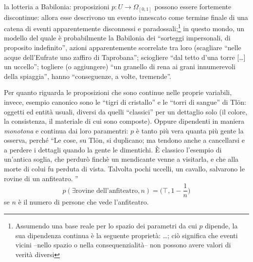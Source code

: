 \documentclass{amsart}
\begin{document}
\begin{example}
  la lotteria a Babilonia: proposizioni $p : U \to \Omega_{[0,1]}$ possono essere fortemente discontinue: allora esse descrivono un evento innescato come termine finale di una catena di eventi apparentemente disconnessi e paradossali;\footnote{Assumendo una base reale per lo spazio dei parametri da cui $p$ dipende, la sua dipendenza continua è la seguente proprietà: \dots; ciò significa che eventi vicini --nello spazio o nella consequenzialità-- non possono avere valori di verità diversi} in questo mondo, un modello del quale è probabilmente la Babilonia dei ``sorteggi impersonali, di proposito indefinito'', azioni apparentemente scorrelate tra loro (scagliare ``nelle acque dell'Eufrate uno zaffiro di Taprobana''; sciogliere ``dal tetto d'una torre [\dots\unkern] un uccello''; togliere (o aggiungere) ``un granello di rena ai grani innumerevoli della spiaggia'', hanno ``conseguenze, a volte, tremende''.
\end{example}
\begin{example}
  Per quanto riguarda le proposizioni che sono continue nelle proprie variabili, invece, esempio canonico sono le ``tigri di cristallo'' e le ``torri di sangue'' di Tl\"{o}n: oggetti ed entità usuali, diversi da quelli ``classici'' per un dettaglio solo (il colore, la consistenza, il materiale di cui sono composte). Oppure dipendenti in maniera \emph{monotona} e continua dai loro paramentri: $p$ è tanto più vera quanta più gente la osserva, perché ``Le cose, su Tlön, si duplicano; ma tendono anche a cancellarsi e a  perdere i dettagli quando la gente le dimentichi. È classico l'esempio di  un'antica soglia, che perdurò finchè un mendicante venne a visitarla, e che alla  morte di colui fu perduta di vista. Talvolta pochi uccelli, un cavallo, salvarono le  rovine di un anfiteatro. ''
        \[\textstyle p(\exists\text{rovine dell'anfiteatro}, n) = \big(\top, 1-\frac{1}{n}\big)\]
        se $n$ è il numero di persone che vede l'anfiteatro.
\end{example}
\end{document}
